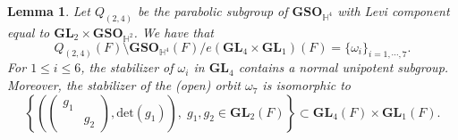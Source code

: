 \documentclass[11pt, reqno]{amsart}
\theoremstyle{plain}
\newtheorem{lemma}[theorem]{Lemma}
\theoremstyle{definition}
\theoremstyle{remark}
\theoremstyle{plain}
\def\GL{\mathbf{GL}}
\begin{document}
\begin{lemma}\label{Final:Double:Quotient}
    Let $Q_{(2,4)}$ be the parabolic subgroup of $\mathbf{GSO}_{\mathbb{H}^4}$ with Levi component equal to $\GL_2\times \mathbf{GSO}_{\mathbb{H}^2}$. We have that 
    \[Q_{(2,4)}(F)\setminus \mathbf{GSO}_{\mathbb{H}^4}(F)/e(\GL_4\times \GL_1)(F) = \{\omega_i\}_{i = 1,\cdots,7}.\]
    For $1\leq i \leq 6$, the stabilizer of $\omega_i$ in $\GL_4$ contains a normal unipotent subgroup. Moreover, the stabilizer of the (open) orbit $ \omega_7$ is isomorphic to   \[\left\{\left(\left(\begin{smallmatrix}g_1& \\ &g_2\end{smallmatrix}\right),\mathrm{det}(g_1)\right),\;g_1,g_2\in \GL_2(F)\right\}\subset \GL_4(F)\times \GL_1(F).\]
\end{lemma}
\end{document}
